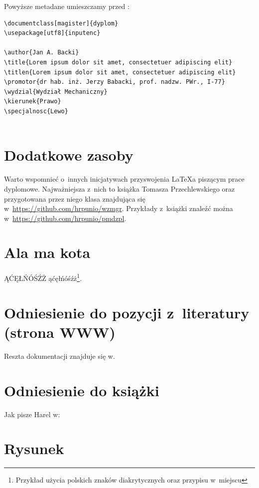 \begin{enumerate}
\begin{itemize}
\end{itemize}
Powyższe metadane umieszczamy przed \verb||:
\begin{verbatim}
\documentclass[magister]{dyplom}
\usepackage[utf8]{inputenc}

\author{Jan A. Backi}
\title{Lorem ipsum dolor sit amet, consectetuer adipiscing elit}
\titlen{Lorem ipsum dolor sit amet, consectetuer adipiscing elit}
\promotor{dr hab. inż. Jerzy Babacki, prof. nadzw. PWr., I-77}
\wydzial{Wydział Mechaniczny}
\kierunek{Prawo}
\specjalnosc{Lewo}


\end{verbatim}

\end{enumerate}

\section{Dodatkowe zasoby}

Warto wspomnieć  o~innych inicjatywach przyswojenia LaTeX{}a piszącym prace dyplomowe. Najważniejsza z~nich to książka Tomasza Przechlewskiego oraz przygotowana przez niego klasa znajdująca się w~\url{https://github.com/hrpunio/wzmgr}. Przykłady z~książki znaleźć można w~\url{https://github.com/hrpunio/pmdzpl}.


\section{Ala ma kota}

ĄĆĘŁŃÓŚŹŻ ąćęłńóśźż\footnote{Przykład użycia polskich znaków diakrytycznych oraz przypisu w~miejscu}. \lipsum[1]

\section{Odniesienie do pozycji z~literatury (strona WWW)}

Reszta dokumentacji znajduje się w. \lipsum[3]

\section{Odniesienie do książki}

Jak pisze Harel w: \lipsum[7]

\section{Rysunek}

